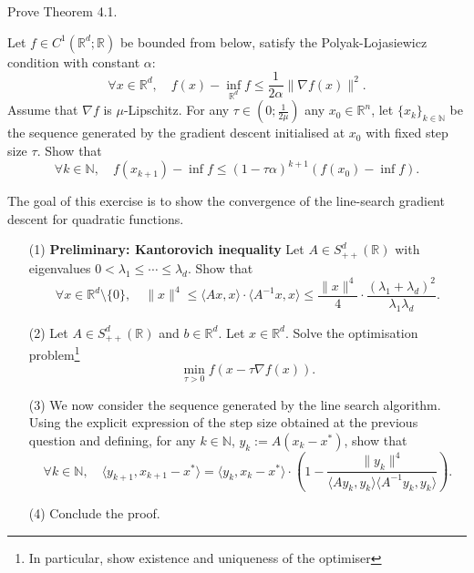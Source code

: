 \begin{exercise}
Prove Theorem 4.1.
\end{exercise}

\begin{exercise}
Let $f \in C^1(\mathbb{R}^d; \mathbb{R})$ be bounded from below, satisfy the Polyak-Lojasiewicz condition with constant $\alpha$:
\[
\forall x \in \mathbb{R}^d, \quad f(x) - \inf_{\mathbb{R}^d} f \leq \frac{1}{2\alpha} \|\nabla f(x)\|^2.
\]
Assume that $\nabla f$ is $\mu$-Lipschitz. For any $\tau \in \left(0; \frac{1}{2\mu}\right)$ any $x_0 \in \mathbb{R}^n$, let $\{x_k\}_{k \in \mathbb{N}}$ be the sequence generated by the gradient descent initialised at $x_0$ with fixed step size $\tau$. Show that
\[
\forall k \in \mathbb{N}, \quad f(x_{k+1}) - \inf f \leq (1 - \tau\alpha)^{k+1}(f(x_0) - \inf f).
\]
\end{exercise}

\begin{exercise}
The goal of this exercise is to show the convergence of the line-search gradient descent for quadratic functions.
\begin{enumerate}
    \item[(1)] \textbf{Preliminary: Kantorovich inequality} Let $A \in S_{++}^d(\mathbb{R})$ with eigenvalues $0 < \lambda_1 \leq \cdots \leq \lambda_d$. Show that
    \[
    \forall x \in \mathbb{R}^d \setminus \{0\}, \quad \|x\|^4 \leq \langle Ax, x \rangle \cdot \langle A^{-1}x, x \rangle \leq \frac{\|x\|^4}{4} \cdot \frac{(\lambda_1 + \lambda_d)^2}{\lambda_1\lambda_d}.
    \]
    \item[(2)] Let $A \in S_{++}^d(\mathbb{R})$ and $b \in \mathbb{R}^d$. Let $x \in \mathbb{R}^d$. Solve the optimisation problem\footnote{In particular, show existence and uniqueness of the optimiser}
    \[
    \min_{\tau > 0} f(x - \tau\nabla f(x)).
    \]
    \item[(3)] We now consider the sequence generated by the line search algorithm. Using the explicit expression of the step size obtained at the previous question and defining, for any $k \in \mathbb{N}$, $y_k := A(x_k - x^*)$, show that
    \[
    \forall k \in \mathbb{N}, \quad \langle y_{k+1}, x_{k+1} - x^* \rangle = \langle y_k, x_k - x^* \rangle \cdot \left(1 - \frac{\|y_k\|^4}{\langle Ay_k, y_k \rangle \langle A^{-1}y_k, y_k \rangle}\right).
    \]
    \item[(4)] Conclude the proof.
\end{enumerate}
\end{exercise}